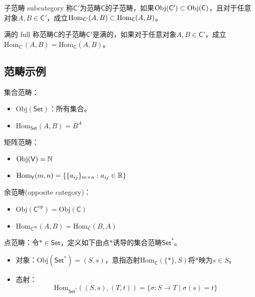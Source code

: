 \begin{definition}{子范畴 subcategory}
	称$\mathsf{C}'$为范畴$\mathsf{C}$的子范畴，如果$\mathrm{Obj}(\mathsf{C'})\subset\mathrm{Obj}(\mathsf{C})$，且对于任意对象$A,B\in\mathsf{C'}$，成立$\mathrm{Hom}_\mathsf{C'}(A,B)\subset\mathrm{Hom}_\mathsf{C}(A,B)$。
\end{definition}

\begin{definition}{满的 full}
	称范畴$\mathsf{C}$的子范畴$\mathsf{C}'$是满的，如果对于任意对象$A,B\in\mathsf{C'}$，成立$\mathrm{Hom}_\mathsf{C'}(A,B)=\mathrm{Hom}_\mathsf{C}(A,B)$。
\end{definition}

\subsection{范畴示例}

\begin{example}
	集合范畴：
	\begin{itemize}
		\item $\mathrm{Obj}(\mathsf{Set})$：所有集合。
		\item $\mathrm{Hom}_{\mathsf{Set}}(A,B)=B^A$
	\end{itemize}
\end{example}

\begin{example}
	矩阵范畴：
	\begin{itemize}
		\item $\mathrm{Obj}(\mathsf{V})=\mathbb{N}$
		\item $\mathrm{Hom}_{\mathsf{V}}(m,n)=\{ \{a_{ij}\}_{m\times n}:a_{ij}\in\mathbb{R} \}$
	\end{itemize}
\end{example}

\begin{example}
	余范畴(opposite category)：
	\begin{itemize}
		\item $\mathrm{Obj}(\mathsf{C}^{\mathrm{op}})=\mathrm{Obj}(\mathsf{C})$
		\item $\mathrm{Hom}_{\mathsf{C}^{\mathrm{op}}}(A,B)=\mathrm{Hom}_{\mathsf{C}}(B,A)$
	\end{itemize}
\end{example}

\begin{example}
	点范畴：令$*\in\mathsf{Set}$，定义如下由点$*$诱导的集合范畴$\mathsf{Set}^*$。
	\begin{itemize}
		\item 对象：$\mathrm{Obj}(\mathsf{Set}^*)=(S,s)$，意指态射$\mathrm{Hom}_\mathsf{C}(\{*\},S)$将$*$映为$s\in S$。
		\item 态射：
		$$
		\mathrm{Hom}_{\mathsf{Set}^*}((S,s),(T,t))=\{ \sigma:S\to T\mid \sigma(s)=t \}
		$$
	\end{itemize}
\end{example}

